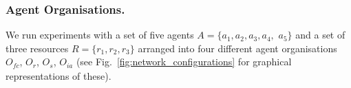 \documentclass{llncs}
\begin{document}
\subsubsection{Agent Organisations.}
We run experiments with a set of five agents $A= \{ a_1,a_2,a_3,a_4,$ $a_5 \} $ and a set of  three resources $R=\{r_1,r_2,r_3\}$ arranged into four different agent organisations $O_{\mathit{fc}}$, $O_{r}$, $O_{s}$, $O_{ia}$ (see Fig.~\ref{fig:network_configurations} for graphical representations of these).
\end{document}
